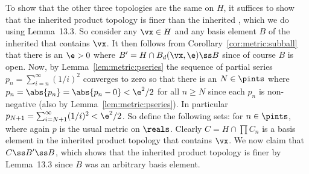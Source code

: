 {{    To show that the other three topologies are the same on $H$, it suffices to show that the inherited product topology is finer than the inherited \elltop{}, which we do using Lemma~13.3.
    So consider any $\vx \in H$ and any basis element $B$ of the inherited \elltop{} that contains $\vx$.
    It then follows from Corollary~\ref{cor:metric:subball} that there is an $\e > 0$ where $B' = H \cap B_d(\vx, \e) \ss B$ since of course $B$ is open.
    Now, by Lemma~\ref{lem:metric:pseries} the sequence of partial series $p_n = \sum_{i=n}^\infty (1/i)^2$ converges to zero so that there is an $N \in \pints$ where $p_n = \abs{p_n} = \abs{p_n - 0} < \e^2/2$ for all $n \geq N$ since each $p_n$ is non-negative (also by Lemma~\ref{lem:metric:pseries}).
    In particular $p_{N+1} = \sum_{i=N+1}^\infty (1/i)^2 < \e^2/2$.
    So define the following sets:
    for $n \in \pints$, where again $p$ is the usual metric on $\reals$.
    Clearly $C = H \cap \prod C_n$ is a basis element in the inherited product topology that contains $\vx$.
    We now claim that $C \ss B' \ss B$, which shows that the inherited product topology is finer by Lemma~13.3 since $B$ was an arbitrary basis element.

}}
